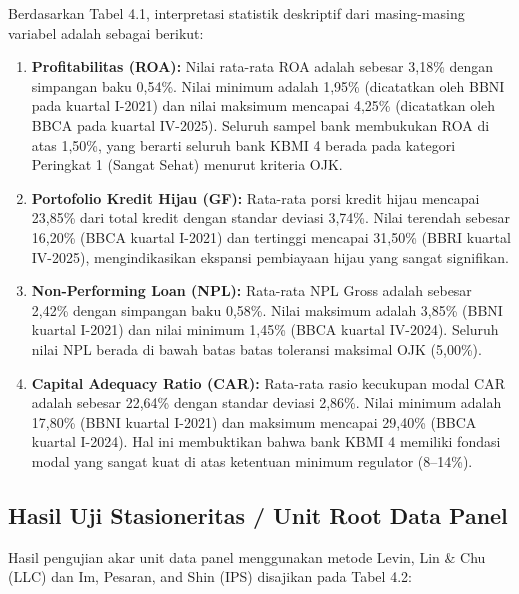 \documentclass[12pt,a4paper]{article}
\numberwithin{equation}{section}
\begin{document}
\noindent
Berdasarkan Tabel 4.1, interpretasi statistik deskriptif dari masing-masing variabel adalah sebagai berikut:
\begin{enumerate}
  \item \textbf{Profitabilitas (ROA):} Nilai rata-rata ROA adalah sebesar 3,18\% dengan simpangan baku 0,54\%. Nilai minimum adalah 1,95\% (dicatatkan oleh BBNI pada kuartal I-2021) dan nilai maksimum mencapai 4,25\% (dicatatkan oleh BBCA pada kuartal IV-2025). Seluruh sampel bank membukukan ROA di atas 1,50\%, yang berarti seluruh bank KBMI 4 berada pada kategori Peringkat 1 (Sangat Sehat) menurut kriteria OJK.
  \item \textbf{Portofolio Kredit Hijau (GF):} Rata-rata porsi kredit hijau mencapai 23,85\% dari total kredit dengan standar deviasi 3,74\%. Nilai terendah sebesar 16,20\% (BBCA kuartal I-2021) dan tertinggi mencapai 31,50\% (BBRI kuartal IV-2025), mengindikasikan ekspansi pembiayaan hijau yang sangat signifikan.
  \item \textbf{Non-Performing Loan (NPL):} Rata-rata NPL Gross adalah sebesar 2,42\% dengan simpangan baku 0,58\%. Nilai maksimum adalah 3,85\% (BBNI kuartal I-2021) dan nilai minimum 1,45\% (BBCA kuartal IV-2024). Seluruh nilai NPL berada di bawah batas batas toleransi maksimal OJK (5,00\%).
  \item \textbf{Capital Adequacy Ratio (CAR):} Rata-rata rasio kecukupan modal CAR adalah sebesar 22,64\% dengan standar deviasi 2,86\%. Nilai minimum adalah 17,80\% (BBNI kuartal I-2021) dan maksimum mencapai 29,40\% (BBCA kuartal I-2024). Hal ini membuktikan bahwa bank KBMI 4 memiliki fondasi modal yang sangat kuat di atas ketentuan minimum regulator (8--14\%).
\end{enumerate}

\subsection{Hasil Uji Stasioneritas / Unit Root Data Panel}

\noindent
Hasil pengujian akar unit data panel menggunakan metode Levin, Lin \& Chu (LLC) dan Im, Pesaran, and Shin (IPS) disajikan pada Tabel 4.2:
\end{document}
